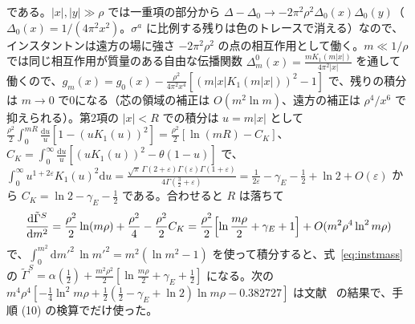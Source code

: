 \documentclass[a4paper,10pt]{ltjsarticle}
\newcommand{\dd}{\mathrm{d}}
\begin{document}
である。$|x|,|y|\gg\rho$ では一重項の部分から $\Delta-\Delta_0\to-2\pi^2\rho^2\Delta_0(x)\Delta_0(y)$（$\Delta_0(x)=1/(4\pi^2x^2)$。$\sigma^a$ に比例する残りは色のトレースで消える）なので、インスタントンは遠方の場に強さ $-2\pi^2\rho^2$ の点の相互作用として働く。$m\ll1/\rho$ では同じ相互作用が質量のある自由な伝播関数 $\Delta^0_m(x)=\frac{mK_1(m|x|)}{4\pi^2|x|}$ を通して働くので、$g_m(x)=g_0(x)-\frac{\rho^2}{4\pi^2x^4}[(m|x|K_1(m|x|))^2-1]$ で、残りの積分は $m\to0$ で0になる（芯の領域の補正は $O(m^2\ln m)$、遠方の補正は $\rho^4/x^6$ で抑えられる）。第2項の $|x|<R$ での積分は $u=m|x|$ として $\frac{\rho^2}2\int_0^{mR}\frac{\dd u}u[1-(uK_1(u))^2]=\frac{\rho^2}2[\ln(mR)-C_K]$、$C_K=\int_0^\infty\frac{\dd u}u[(uK_1(u))^2-\theta(1-u)]$ で、$\int_0^\infty u^{1+2\varepsilon}K_1(u)^2\dd u=\frac{\sqrt\pi\,\Gamma(2+\varepsilon)\Gamma(\varepsilon)\Gamma(1+\varepsilon)}{4\Gamma(\frac32+\varepsilon)}=\frac1{2\varepsilon}-\gamma_E-\frac12+\ln2+O(\varepsilon)$ から $C_K=\ln2-\gamma_E-\frac12$ である。合わせると $R$ は落ちて
\begin{equation*}
\frac{\dd\tilde\Gamma^S}{\dd m^2}=\frac{\rho^2}2\ln(m\rho)+\frac{\rho^2}4-\frac{\rho^2}2C_K=\frac{\rho^2}2\Bigl[\ln\frac{m\rho}2+\gamma_E+1\Bigr]+O(m^2\rho^4\ln^2m\rho)
\end{equation*}
で、$\int_0^{m^2}\dd m'^2\,\ln m'^2=m^2(\ln m^2-1)$ を使って積分すると、式~\eqref{eq:instmass} の $\tilde\Gamma^S=\alpha(\frac12)+\frac{m^2\rho^2}2[\ln\frac{m\rho}2+\gamma_E+\frac12]$ になる。次の $m^4\rho^4[-\frac14\ln^2m\rho+\frac12(\frac12-\gamma_E+\ln2)\ln m\rho-0.382727]$ は文献~\cite{hlm09} の結果で、手順 (10) の検算でだけ使った。
\end{document}
